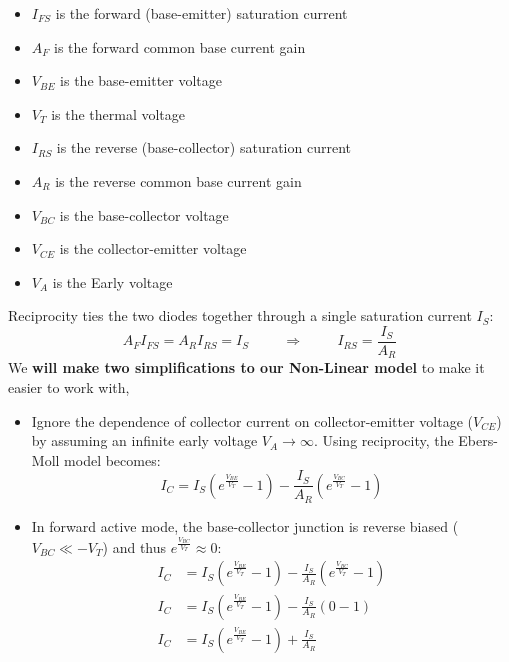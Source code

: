 \begin{itemize}
\begin{itemize}
\begin{itemize}
          \item \(I_{FS}\) is the forward (base-emitter) saturation current
          \item \(A_F\) is the forward common base current gain
          \item \(V_{BE}\) is the base-emitter voltage
          \item \(V_T\) is the thermal voltage
          \item \(I_{RS}\) is the reverse (base-collector) saturation current
          \item \(A_R\) is the reverse common base current gain
          \item \(V_{BC}\) is the base-collector voltage
          \item \(V_{CE}\) is the collector-emitter voltage
          \item \(V_A\) is the Early voltage
        \end{itemize}
        Reciprocity ties the two diodes together through a single
        saturation current \(I_S\):
        \[
          A_F I_{FS} = A_R I_{RS} = I_S
          \hspace{1cm} \Rightarrow \hspace{1cm}
          I_{RS} = \frac{I_S}{A_R}
        \]
        We \textbf{will make two simplifications to our Non-Linear model} to make
        it easier to work with,
        \begin{itemize}
          \item Ignore the dependence of collector current on collector-emitter
            voltage (\(V_{CE}\)) by assuming an infinite early voltage \(V_A \to \infty\).
            Using reciprocity, the Ebers-Moll model becomes:
            \[
              I_C = I_S \left( e^{\frac{V_{BE}}{V_T}} - 1 \right) - \frac{I_S}{A_R} \left( e^{\frac{V_{BC}}{V_T}} - 1 \right)
            \]
          \item In forward active mode, the base-collector junction is reverse biased
            (\(V_{BC} \ll -V_T\)) and thus \( e^{\frac{V_{BC}}{V_T}} \approx 0 \):
            \begin{align*}
              I_C &= I_S \left( e^{\frac{V_{BE}}{V_T}} - 1 \right) - \frac{I_S}{A_R} \left( e^{\frac{V_{BC}}{V_T}} - 1 \right) \\
              I_C &= I_S \left( e^{\frac{V_{BE}}{V_T}} - 1 \right) - \frac{I_S}{A_R}(0 - 1) \\
              I_C &= I_S \left( e^{\frac{V_{BE}}{V_T}} - 1 \right) + \frac{I_S}{A_R} \\

\end{align*}
\end{itemize}
\end{itemize}
\end{itemize}
